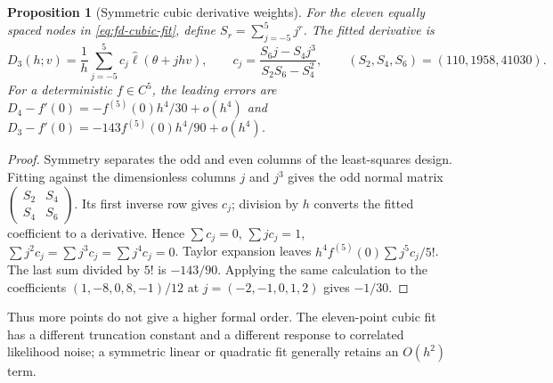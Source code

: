 \documentclass[11pt]{article}
\newtheorem{proposition}{Proposition}
\begin{document}
\begin{proposition}[Symmetric cubic derivative weights]
\label{prop:fd-cubic-weights}
For the eleven equally spaced nodes in \eqref{eq:fd-cubic-fit}, define
$S_r=\sum_{j=-5}^{5}j^r$. The fitted derivative is
\begin{equation}
 D_3(h;v)=\frac1h\sum_{j=-5}^{5}c_j\widehat\ell(\theta+jhv),\qquad
 c_j=\frac{S_6j-S_4j^3}{S_2S_6-S_4^2},\qquad
 (S_2,S_4,S_6)=(110,1958,41030).          \label{eq:fd-cubic-weights}
\end{equation}
For a deterministic $f\in C^5$, the leading errors are
$D_4-f'(0)=-f^{(5)}(0)h^4/30+o(h^4)$ and
$D_3-f'(0)=-143f^{(5)}(0)h^4/90+o(h^4)$.
\end{proposition}
\begin{proof}
Symmetry separates the odd and even columns of the least-squares design.
Fitting against the dimensionless columns $j$ and $j^3$ gives the odd normal
matrix $\left(\begin{smallmatrix}S_2&S_4\\S_4&S_6\end{smallmatrix}\right)$.
Its first inverse row gives $c_j$; division by $h$ converts the fitted
coefficient to a derivative. Hence $\sum c_j=0$, $\sum jc_j=1$,
$\sum j^2c_j=\sum j^3c_j=\sum j^4c_j=0$.
Taylor expansion leaves $h^4 f^{(5)}(0)\sum j^5c_j/5!$.
The last sum divided by $5!$ is $-143/90$. Applying the same calculation to
the coefficients $(1,-8,0,8,-1)/12$ at $j=(-2,-1,0,1,2)$ gives $-1/30$.
\end{proof}
Thus more points do not give a higher formal order. The eleven-point cubic fit
has a different truncation constant and a different response to correlated
likelihood noise; a symmetric linear or quadratic fit generally retains an
$O(h^2)$ term.
\end{document}
